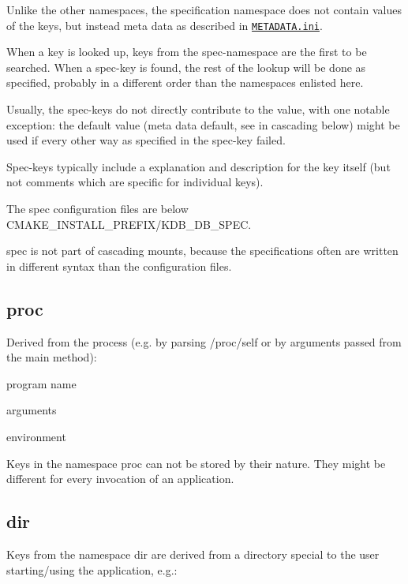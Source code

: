 Unlike the other namespaces, the specification namespace does not contain values of the keys, but instead meta data as described in \href{/home/markus/Projekte/Elektra/current/doc/METADATA.ini}{\tt M\+E\+T\+A\+D\+A\+T\+A.\+ini}.

When a key is looked up, keys from the spec-\/namespace are the first to be searched. When a spec-\/key is found, the rest of the lookup will be done as specified, probably in a different order than the namespaces enlisted here.

Usually, the spec-\/keys do not directly contribute to the value, with one notable exception\+: the default value (meta data {\ttfamily default}, see in cascading below) might be used if every other way as specified in the spec-\/key failed.

Spec-\/keys typically include a explanation and description for the key itself (but not comments which are specific for individual keys).

The spec configuration files are below C\+M\+A\+K\+E\+\_\+\+I\+N\+S\+T\+A\+L\+L\+\_\+\+P\+R\+E\+F\+I\+X/\+K\+D\+B\+\_\+\+D\+B\+\_\+\+S\+P\+E\+C.

spec is not part of cascading mounts, because the specifications often are written in different syntax than the configuration files.

\subsection*{proc}

Derived from the process (e.\+g. by parsing /proc/self or by arguments passed from the main method)\+:


\begin{DoxyItemize}
\item program name
\item arguments
\item environment
\end{DoxyItemize}

Keys in the namespace proc can not be stored by their nature. They might be different for every invocation of an application.

\subsection*{dir}

Keys from the namespace {\ttfamily dir} are derived from a directory special to the user starting/using the application, e.\+g.\+:


